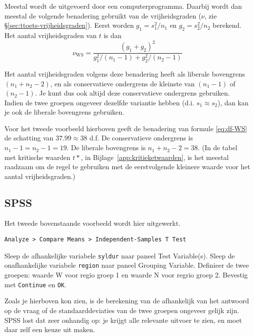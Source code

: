 \documentclass[
]{book}
\begin{document}
Meestal wordt de uitgevoerd door een computerprogramma. Daarbij wordt
dan meestal de volgende benadering gebruikt van de vrijheidsgraden
(\(\nu\), zie §\ref{sec:ttoets-vrijheidsgraden}).
Eerst worden \(g_1=s^2_1/n_1\)
en \(g_2=s^2_2/n_2\) berekend. Het aantal vrijheidsgraden van \(t\) is dan
\begin{equation}
  \label{eq:df-WS}
  \nu_\textrm{WS} = 
        \frac {(g_1+g_2)^2} {g^2_1/(n_1-1) + g^2_2/(n_2-1)}
\end{equation}

Het aantal vrijheidsgraden volgens deze benadering heeft als liberale
bovengrens \((n_1+n_2-2)\), en als conservatieve ondergrens de kleinste
van \((n_1-1)\) of \((n_2-1)\). Je kunt dus ook altijd deze conservatieve
ondergrens gebruiken. Indien de twee groepen ongeveer dezelfde variantie
hebben (d.i. \(s_1 \approx s_2\)), dan kan je ook de liberale bovengrens
gebruiken.

Voor het tweede voorbeeld hierboven geeft de benadering van formule
\eqref{eq:df-WS} de
schatting van \(37.99 \approx 38\) d.f. De conservatieve ondergrens is
\(n_1-1 = n_2-1 = 19\). De liberale bovengrens is \(n_1+n_2 -2 = 38\). (In
de tabel met kritische waarden \(t*\), in
Bijlage~\ref{app:kritieketwaarden}, is het meestal raadzaam om de regel
te gebruiken met de eerstvolgende kleinere waarde voor het aantal
vrijheidsgraden.)

\hypertarget{sec:SPSS-ttoets-ongepaard}{%
\subsection{SPSS}\label{sec:SPSS-ttoets-ongepaard}}

Het tweede bovenstaande voorbeeld wordt hier uitgewerkt.

\begin{verbatim}
Analyze > Compare Means > Independent-Samples T Test
\end{verbatim}

Sleep de afhankelijke variabele \texttt{syldur} naar paneel Test Variable(s).
Sleep de onafhankelijke variabele \texttt{region} naar paneel Grouping
Variable. Definieer de twee groepen: waarde W voor regio groep 1 en
waarde N voor regrio groep 2. Bevestig met \texttt{Continue} en \texttt{OK}.

Zoals je hierboven kon zien, is de berekening van de afhankelijk van het
antwoord op de vraag of de standaarddeviaties van de twee groepen
ongeveer gelijk zijn. SPSS lost dat zeer onhandig op: je krijgt alle
relevante uitvoer te zien, en moet daar zelf een keuze uit maken.
\end{document}
